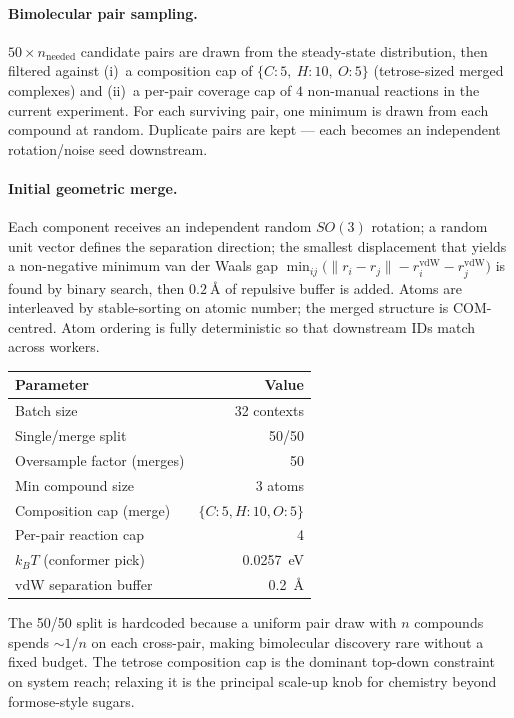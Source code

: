\paragraph{Bimolecular pair sampling.}
$50 \times n_\text{needed}$ candidate pairs are drawn from the steady-state distribution, then filtered against (i)~a composition cap of $\{C{:}5,\ H{:}10,\ O{:}5\}$ (tetrose-sized merged complexes) and (ii)~a per-pair coverage cap of $4$ non-manual reactions in the current experiment. For each surviving pair, one minimum is drawn from each compound at random. Duplicate pairs are kept --- each becomes an independent rotation/noise seed downstream.

\paragraph{Initial geometric merge.}
Each component receives an independent random $SO(3)$ rotation; a random unit vector defines the separation direction; the smallest displacement that yields a non-negative minimum van der Waals gap $\min_{ij}\bigl(\lVert r_i - r_j \rVert - r^{\text{vdW}}_i - r^{\text{vdW}}_j\bigr)$ is found by binary search, then $\SI{0.2}{\angstrom}$ of repulsive buffer is added. Atoms are interleaved by stable-sorting on atomic number; the merged structure is COM-centred. Atom ordering is fully deterministic so that downstream IDs match across workers.

\noindent\begin{tabular}{lr}
\toprule
Parameter & Value \\
\midrule
Batch size & 32 contexts \\
Single/merge split & 50/50 \\
Oversample factor (merges) & 50 \\
Min compound size & 3 atoms \\
Composition cap (merge) & $\{C{:}5,H{:}10,O{:}5\}$ \\
Per-pair reaction cap & 4 \\
$k_B T$ (conformer pick) & \SI{0.0257}{eV} \\
vdW separation buffer & \SI{0.2}{\angstrom} \\
\bottomrule
\end{tabular}

The 50/50 split is hardcoded because a uniform pair draw with $n$ compounds spends $\sim 1/n$ on each cross-pair, making bimolecular discovery rare without a fixed budget. The tetrose composition cap is the dominant top-down constraint on system reach; relaxing it is the principal scale-up knob for chemistry beyond formose-style sugars.


